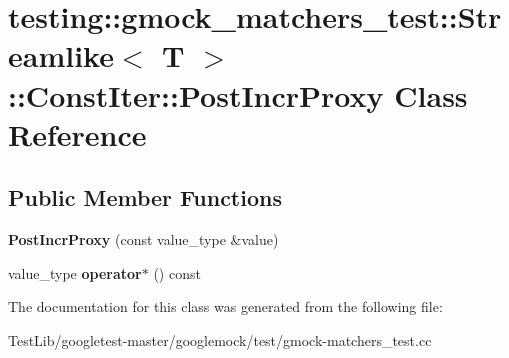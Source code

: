 \hypertarget{classtesting_1_1gmock__matchers__test_1_1Streamlike_1_1ConstIter_1_1PostIncrProxy}{}\section{testing\+:\+:gmock\+\_\+matchers\+\_\+test\+:\+:Streamlike$<$ T $>$\+:\+:Const\+Iter\+:\+:Post\+Incr\+Proxy Class Reference}
\label{classtesting_1_1gmock__matchers__test_1_1Streamlike_1_1ConstIter_1_1PostIncrProxy}
\subsection*{Public Member Functions}
\begin{DoxyCompactItemize}
\item 
\mbox{\label{classtesting_1_1gmock__matchers__test_1_1Streamlike_1_1ConstIter_1_1PostIncrProxy_a1915f8db9943b0a995c4e01d6120fc80}} 
{\bfseries Post\+Incr\+Proxy} (const value\+\_\+type \&value)
\item 
\mbox{\label{classtesting_1_1gmock__matchers__test_1_1Streamlike_1_1ConstIter_1_1PostIncrProxy_a7d5416380b6b6cec0d0ed5b5c9be17b3}} 
value\+\_\+type {\bfseries operator$\ast$} () const
\end{DoxyCompactItemize}


The documentation for this class was generated from the following file\+:\begin{DoxyCompactItemize}
\item 
Test\+Lib/googletest-\/master/googlemock/test/gmock-\/matchers\+\_\+test.\+cc\end{DoxyCompactItemize}
